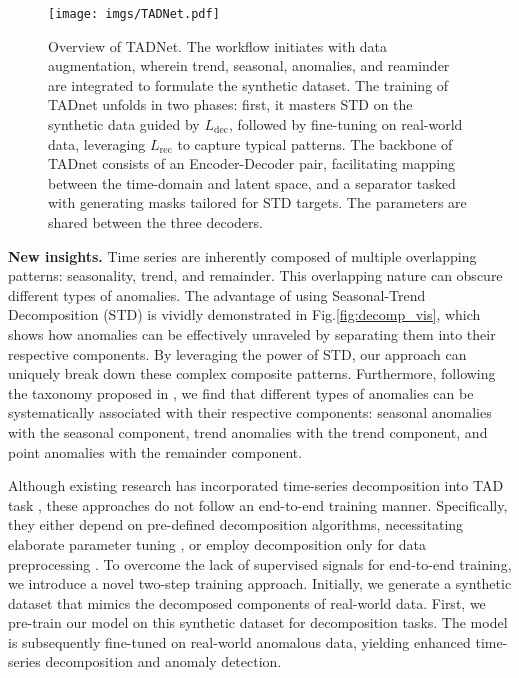 \documentclass{article}
\begin{document}
\begin{figure*}[t]
\centering
\texttt{[image: imgs/TADNet.pdf]}
\caption{Overview of TADNet. The workflow initiates with data augmentation, wherein trend, seasonal, anomalies, and reaminder are integrated to formulate the synthetic dataset. The training of TADnet unfolds in two phases: first, it masters STD on the synthetic data guided by \(L_{\text{dec}}\), followed by fine-tuning on real-world data, leveraging \(L_{\text{rec}}\) to capture typical patterns. The backbone of TADnet consists of an Encoder-Decoder pair, facilitating mapping between the time-domain and latent space, and a separator tasked with generating masks tailored for STD targets. The parameters are shared between the three decoders.}
\label{fig:model}
\vspace{-10pt}
\end{figure*}

\textbf{New insights.} Time series are inherently composed of multiple overlapping patterns: seasonality, trend, and remainder. This overlapping nature can obscure different types of anomalies. The advantage of using Seasonal-Trend Decomposition (STD) \cite{cleveland1990stl} is vividly demonstrated in Fig.\ref{fig:decomp_vis}, which shows how anomalies can be effectively unraveled by separating them into their respective components. By leveraging the power of STD, our approach can uniquely break down these complex composite patterns. Furthermore, following the taxonomy proposed in \cite{lai2021revisiting}, we find that different types of anomalies can be systematically associated with their respective components: seasonal anomalies with the seasonal component, trend anomalies with the trend component, and point anomalies with the remainder component.

Although existing research has incorporated time-series decomposition into TAD task \cite{qin2022decomposed, gao2020robusttad}, these approaches do not follow an end-to-end training manner. Specifically, they either depend on pre-defined decomposition algorithms, necessitating elaborate parameter tuning \cite{gao2020robusttad}, or employ decomposition only for data preprocessing \cite{qin2022decomposed}.
To overcome the lack of supervised signals for end-to-end training, we introduce a novel two-step training approach. Initially, we generate a synthetic dataset that mimics the decomposed components of real-world data. First, we pre-train our model on this synthetic dataset for decomposition tasks. The model is subsequently fine-tuned on real-world anomalous data, yielding enhanced time-series decomposition and anomaly detection.
\end{document}
